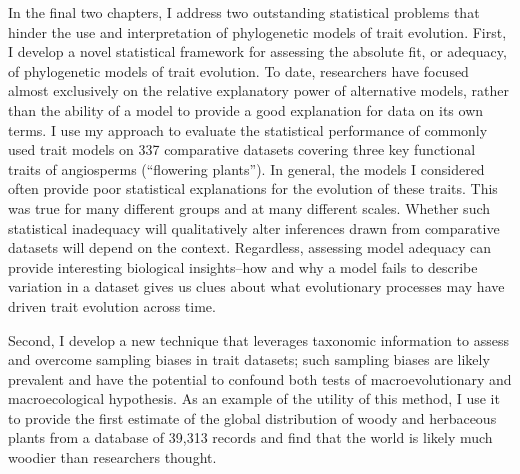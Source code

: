 In the final two chapters, I address two outstanding statistical problems that hinder the use and interpretation of phylogenetic models of trait evolution. First, I develop a novel statistical framework for assessing the absolute fit, or adequacy, of phylogenetic models of trait evolution. To date, researchers have focused almost exclusively on the relative explanatory power of alternative models, rather than the ability of a model to provide a good explanation for data on its own terms. I use my approach to evaluate the statistical performance of commonly used trait models on 337 comparative datasets covering three key functional traits of angiosperms (``flowering plants''). In general, the models I considered often provide poor statistical explanations for the evolution of these traits. This was true for many different groups and at many different scales.  Whether such statistical inadequacy will qualitatively alter inferences drawn from comparative datasets will depend on the context. Regardless, assessing model adequacy can provide interesting biological insights--how and why a model fails to describe variation in a dataset gives us clues about what evolutionary processes may have driven trait evolution across time.

Second, I develop a new technique that leverages taxonomic information to assess and overcome sampling biases in trait datasets; such sampling biases are likely prevalent and have the potential to confound both tests of macroevolutionary and macroecological hypothesis. As an example of the utility of this method, I use it to provide the first estimate of the global distribution of woody and herbaceous plants from a database of 39,313 records and find that the world is likely much woodier than researchers thought. 


